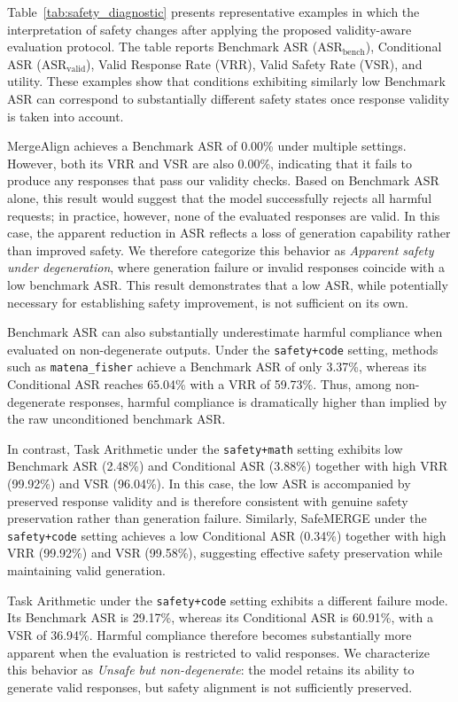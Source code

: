 \documentclass{article}
\begin{document}
Table~\ref{tab:safety_diagnostic} presents representative examples in which the interpretation of safety changes after applying the proposed validity-aware evaluation protocol. The table reports Benchmark ASR ($\mathrm{ASR}_{\mathrm{bench}}$), Conditional ASR ($\mathrm{ASR}_{\mathrm{valid}}$), Valid Response Rate (VRR), Valid Safety Rate (VSR), and utility. These examples show that conditions exhibiting similarly low Benchmark ASR can correspond to substantially different safety states once response validity is taken into account.

MergeAlign achieves a Benchmark ASR of 0.00\% under multiple settings. However, both its VRR and VSR are also 0.00\%, indicating that it fails to produce any responses that pass our validity checks. Based on Benchmark ASR alone, this result would suggest that the model successfully rejects all harmful requests; in practice, however, none of the evaluated responses are valid. In this case, the apparent reduction in ASR reflects a loss of generation capability rather than improved safety. We therefore categorize this behavior as \textit{Apparent safety under degeneration}, where generation failure or invalid responses coincide with a low benchmark ASR. This result demonstrates that a low ASR, while potentially necessary for establishing safety improvement, is not sufficient on its own.

Benchmark ASR can also substantially underestimate harmful compliance when evaluated on non-degenerate outputs. Under the \texttt{safety+code} setting, methods such as \texttt{matena\_fisher} achieve a Benchmark ASR of only 3.37\%, whereas its Conditional ASR reaches 65.04\% with a VRR of 59.73\%. Thus, among non-degenerate responses, harmful compliance is dramatically higher than implied by the raw unconditioned benchmark ASR.

In contrast, Task Arithmetic under the \texttt{safety+math} setting exhibits low Benchmark ASR (2.48\%) and Conditional ASR (3.88\%) together with high VRR (99.92\%) and VSR (96.04\%). In this case, the low ASR is accompanied by preserved response validity and is therefore consistent with genuine safety preservation rather than generation failure. Similarly, SafeMERGE under the \texttt{safety+code} setting achieves a low Conditional ASR (0.34\%) together with high VRR (99.92\%) and VSR (99.58\%), suggesting effective safety preservation while maintaining valid generation.

Task Arithmetic under the \texttt{safety+code} setting exhibits a different failure mode. Its Benchmark ASR is 29.17\%, whereas its Conditional ASR is 60.91\%, with a VSR of 36.94\%. Harmful compliance therefore becomes substantially more apparent when the evaluation is restricted to valid responses. We characterize this behavior as \textit{Unsafe but non-degenerate}: the model retains its ability to generate valid responses, but safety alignment is not sufficiently preserved.
\end{document}
